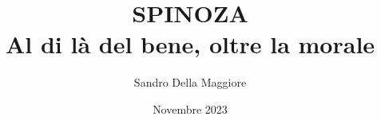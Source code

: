 \documentclass[a4paper,12pt,twoside,openany]{book}%
\begin{document}
	\author{Sandro Della Maggiore}
	\title{\Huge SPINOZA\\{\Large Al di là del bene, oltre la morale}}
	\date{Novembre 2023}
	\maketitle
		

		
	
	
	
	
	
	
	
	
\end{document}
